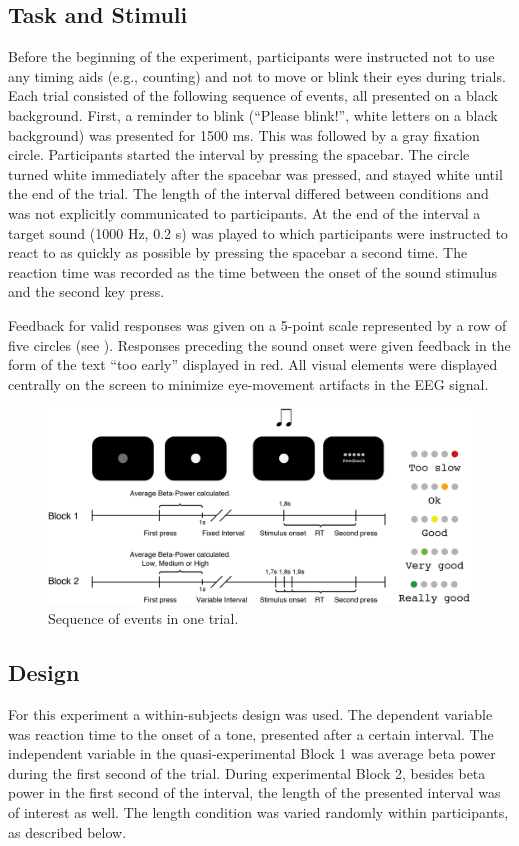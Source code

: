 \documentclass[man,floatsintext]{apa6} %
\begin{document}
\subsection{Task and Stimuli}
Before the beginning of the experiment, participants were instructed
not to use any timing aids (e.g., counting) and not to move or blink
their eyes during trials. Each trial consisted of the following
sequence of events, all presented on a black background. First, a
reminder to blink (``Please blink!'', white letters on a black
background) was presented for 1500 ms. This was followed by a gray
fixation circle. Participants started the interval by pressing the
spacebar. The circle turned white immediately after the spacebar was
pressed, and stayed white until the end of the trial. The length of
the interval differed between conditions and was not explicitly
communicated to participants. At the end of the interval a target
sound (1000 Hz, 0.2 s) was played to which participants were
instructed to react to as quickly as possible by pressing the spacebar
a second time. The reaction time was recorded as the time between the
onset of the sound stimulus and the second key press.

Feedback for valid responses was given on a 5-point scale represented
by a row of five circles (see ). Responses preceding
the sound onset were given feedback in the form of the text ``too
early'' displayed in red. All visual elements were displayed centrally
on the screen to minimize eye-movement artifacts in the EEG signal.

\begin{figure}[!h]
  \includegraphics[width=\textwidth]{trial}
  \caption{Sequence of events in one trial.}
  \label{fig:task}
\end{figure}

\subsection{Design}
For this experiment a within-subjects design was used. The dependent
variable was reaction time to the onset of a tone, presented after a
certain interval. The independent variable in the quasi-experimental
Block 1 was average beta power during the first second of the
trial. During experimental Block 2, besides beta power in the first
second of the interval, the length of the presented interval was of
interest as well. The length condition was varied randomly within
participants, as described below.
\end{document}
